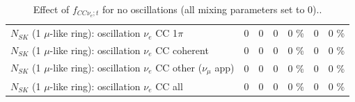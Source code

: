 \begin{table}
\begin{tabular}{| l | r | r | r  r | r  r |}
                     $N_{SK}$ (1 $\mu$-like ring): oscillation $\nu_e$ CC 1$\pi$ &               0 &               0 &               0 &        0 \%  &               0 &        0 \%  \\ 
                   $N_{SK}$ (1 $\mu$-like ring): oscillation $\nu_e$ CC coherent &               0 &               0 &               0 &        0 \%  &               0 &        0 \%  \\ 
      $N_{SK}$ (1 $\mu$-like ring): oscillation $\nu_e$ CC other ($\nu_\mu$ app) &               0 &               0 &               0 &        0 \%  &               0 &        0 \%  \\ 
                       $N_{SK}$ (1 $\mu$-like ring): oscillation $\nu_e$  CC all &               0 &               0 &               0 &        0 \%  &               0 &        0 \%  \\ 
\hline
\hline
\end{tabular}
\caption{ Effect of $f_{CC\nu_e; t}$ for no oscillations (all mixing parameters set to 0).. }
\label{tab:num_xsec_norm_nuetonumu_1RmuT_3f_osc_t13:0}
\end{table}
\clearpage
